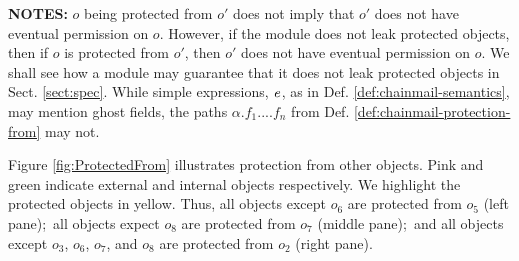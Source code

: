 { \noindent
 {\textbf{NOTES:}  \notesep $o$ being protected from $o'$ does not imply that $o'$ does not have eventual permission on $o$. However, if the module does not leak protected objects, then if  $o$ is protected from $o'$, then $o'$ does not have eventual permission on $o$. We shall  see how a module may guarantee that it does not leak protected objects in Sect. \ref{sect:spec}.
\notesep While simple expressions, $\mathit{e}$, as in Def. \ref{def:chainmail-semantics},  may mention ghost fields,   the paths $\alpha.f_1....f_n$ 
 from Def. \ref{def:chainmail-protection-from} may not. %


Figure \ref{fig:ProtectedFrom} illustrates  protection from other objects. Pink and green indicate external and internal objects respectively.
We highlight the protected objects in yellow. Thus, all objects except $o_6$ are protected from $o_5$ (left pane);\ all objects expect $o_8$ are protected from $o_7$ (middle pane);\ and all objects except $o_3$, $o_6$, $o_7$, and $o_8$ are protected from $o_2$ (right pane). 


}}
